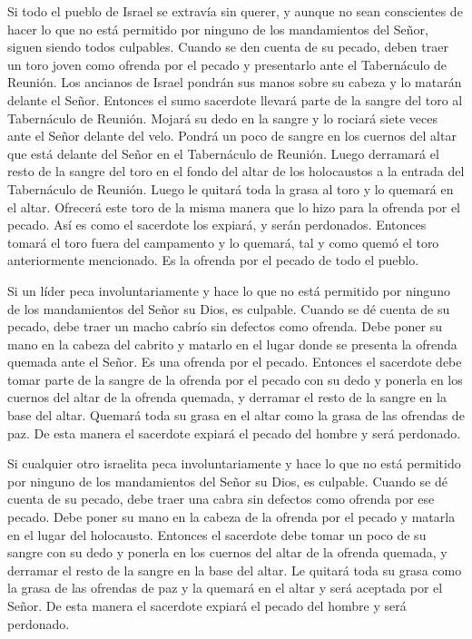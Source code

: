  Si todo el pueblo de Israel se extravía sin querer, y
aunque no sean conscientes de hacer lo que no está permitido por ninguno
de los mandamientos del Señor, siguen siendo todos culpables.
 Cuando se den cuenta de su pecado, deben traer un toro
joven como ofrenda por el pecado y presentarlo ante el Tabernáculo de
Reunión.  Los ancianos de Israel pondrán sus manos sobre su
cabeza y lo matarán delante el Señor.  Entonces el sumo
sacerdote llevará parte de la sangre del toro al Tabernáculo de Reunión.
 Mojará su dedo en la sangre y lo rociará siete veces ante
el Señor delante del velo.  Pondrá un poco de sangre en los
cuernos del altar que está delante del Señor en el Tabernáculo de
Reunión. Luego derramará el resto de la sangre del toro en el fondo del
altar de los holocaustos a la entrada del Tabernáculo de Reunión.
 Luego le quitará toda la grasa al toro y lo quemará en el
altar.  Ofrecerá este toro de la misma manera que lo hizo
para la ofrenda por el pecado. Así es como el sacerdote los expiará, y
serán perdonados.  Entonces tomará el toro fuera del
campamento y lo quemará, tal y como quemó el toro anteriormente
mencionado. Es la ofrenda por el pecado de todo el pueblo.

 Si un líder peca involuntariamente y hace lo que no está
permitido por ninguno de los mandamientos del Señor su Dios, es
culpable.  Cuando se dé cuenta de su pecado, debe traer un
macho cabrío sin defectos como ofrenda.  Debe poner su mano
en la cabeza del cabrito y matarlo en el lugar donde se presenta la
ofrenda quemada ante el Señor. Es una ofrenda por el pecado.
 Entonces el sacerdote debe tomar parte de la sangre de la
ofrenda por el pecado con su dedo y ponerla en los cuernos del altar de
la ofrenda quemada, y derramar el resto de la sangre en la base del
altar.  Quemará toda su grasa en el altar como la grasa de
las ofrendas de paz. De esta manera el sacerdote expiará el pecado del
hombre y será perdonado.

 Si cualquier otro israelita peca involuntariamente y hace
lo que no está permitido por ninguno de los mandamientos del Señor su
Dios, es culpable.  Cuando se dé cuenta de su pecado, debe
traer una cabra sin defectos como ofrenda por ese pecado. 
Debe poner su mano en la cabeza de la ofrenda por el pecado y matarla en
el lugar del holocausto.  Entonces el sacerdote debe tomar
un poco de su sangre con su dedo y ponerla en los cuernos del altar de
la ofrenda quemada, y derramar el resto de la sangre en la base del
altar.  Le quitará toda su grasa como la grasa de las
ofrendas de paz y la quemará en el altar y será aceptada por el Señor.
De esta manera el sacerdote expiará el pecado del hombre y será
perdonado.

